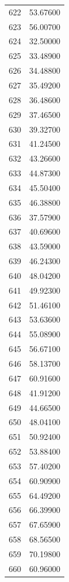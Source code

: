 \documentclass[
  letterpaper,
  DIV=11,
  numbers=noendperiod]{scrreprt}
\begin{document}
\begin{tcolorbox}
\begin{tabular}{lr}
622  &         53.67600 \\
623  &         56.00700 \\
624  &         32.50000 \\
625  &         33.48900 \\
626  &         34.48800 \\
627  &         35.49200 \\
628  &         36.48600 \\
629  &         37.46500 \\
630  &         39.32700 \\
631  &         41.24500 \\
632  &         43.26600 \\
633  &         44.87300 \\
634  &         45.50400 \\
635  &         46.38800 \\
636  &         37.57900 \\
637  &         40.69600 \\
638  &         43.59000 \\
639  &         46.24300 \\
640  &         48.04200 \\
641  &         49.92300 \\
642  &         51.46100 \\
643  &         53.63600 \\
644  &         55.08900 \\
645  &         56.67100 \\
646  &         58.13700 \\
647  &         60.91600 \\
648  &         41.91200 \\
649  &         44.66500 \\
650  &         48.04100 \\
651  &         50.92400 \\
652  &         53.88400 \\
653  &         57.40200 \\
654  &         60.90900 \\
655  &         64.49200 \\
656  &         66.39900 \\
657  &         67.65900 \\
658  &         68.56500 \\
659  &         70.19800 \\
660  &         60.96000 \\

\end{tabular}
\end{tcolorbox}
\end{document}
